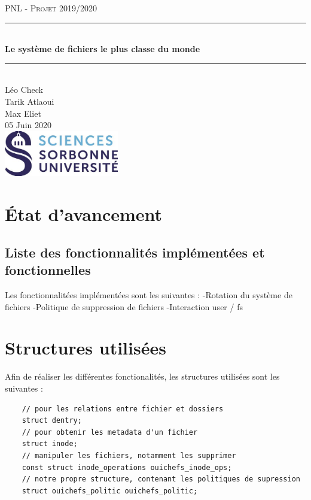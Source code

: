 \documentclass{article}
\date{\today}
\author{Léo Check\\ Tarik Atlaoui \\ Max Eliet}
\begin{document}
\begin{titlepage}
	\enlargethispage{2cm}
	\newcommand{\HRule}{\rule{\linewidth}{0.5mm}}
	\center
	\textsc{\LARGE
	PNL - Projet 2019/2020
	} \\[1cm]
	\HRule \\[0.4cm]
	{ \huge \bfseries Le système de fichiers le plus classe du monde \\[0.15cm] }
	\HRule \\[4cm]
	\large{Léo Check \\[3mm] Tarik Atlaoui \\[3mm] Max Eliet} \\[3cm]
	05 Juin 2020 \\[3cm]
	\hfill \includegraphics[width=5cm]{logoSU.jpg}
\end{titlepage}

	\newpage
	\section{État d'avancement}
	\subsection{Liste des fonctionnalités implémentées et fonctionnelles}
	Les fonctionnalitées implémentées sont les suivantes :
	\newline
	-Rotation du système de fichiers
	\newline
	-Politique de suppression de fichiers
	\newline
	-Interaction user / fs
	\section{Structures utilisées}
	Afin de réaliser les différentes fonctionalités, les structures utilisées sont les suivantes :
	\begin{lstlisting}
	// pour les relations entre fichier et dossiers
	struct dentry;
	// pour obtenir les metadata d'un fichier
	struct inode;
	// manipuler les fichiers, notamment les supprimer
	const struct inode_operations ouichefs_inode_ops;
	// notre propre structure, contenant les politiques de supression
	struct ouichefs_politic ouichefs_politic;
	\end{lstlisting}
\end{document}
